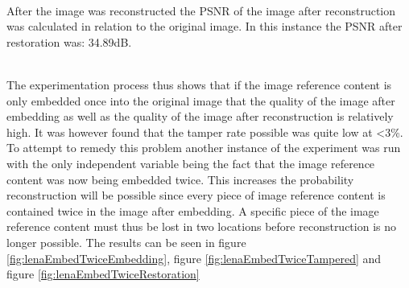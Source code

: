 \documentclass[12pt]{article}
\begin{document}
\hspace{0pt} \\
After the image was reconstructed the PSNR of the image after reconstruction was calculated in relation to the original image.
In this instance the PSNR after restoration was: 34.89dB.

\hspace{0pt} \\
The experimentation process thus shows that if the image reference content is only embedded once into the original image that the quality of the image after embedding as well as the quality of the image after reconstruction is relatively high.
It was however found that the tamper rate possible was quite low at \textless 3\%.
To attempt to remedy this problem another instance of the experiment was run with the only independent variable being the fact that the image reference content was now being embedded twice.
This increases the probability reconstruction will be possible since every piece of image reference content is contained twice in the image after embedding.
A specific piece of the image reference content must thus be lost in two locations before reconstruction is no longer possible.
The results can be seen in figure \ref{fig:lenaEmbedTwiceEmbedding}, figure \ref{fig:lenaEmbedTwiceTampered} and figure \ref{fig:lenaEmbedTwiceRestoration}
\end{document}
